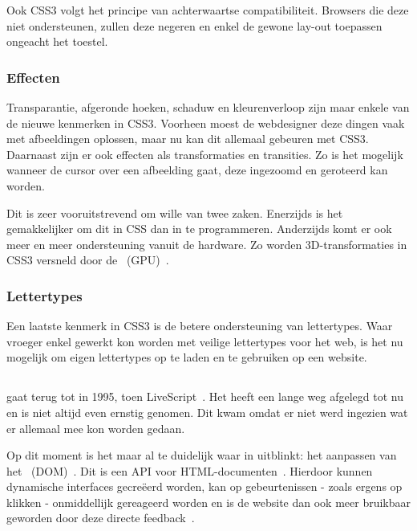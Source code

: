 Ook CSS3 volgt het principe van achterwaartse compatibiliteit. 
Browsers die deze  niet ondersteunen, zullen deze negeren en enkel de gewone lay-out toepassen ongeacht het toestel.

\subsubsection{Effecten}
Transparantie, afgeronde hoeken, schaduw en kleurenverloop zijn maar enkele van de nieuwe kenmerken in CSS3. 
Voorheen moest de webdesigner deze dingen vaak met afbeeldingen oplossen, maar nu kan dit allemaal gebeuren met CSS3. 
Daarnaast zijn er ook effecten als transformaties en transities. 
Zo is het mogelijk wanneer de cursor over een afbeelding gaat, deze ingezoomd en geroteerd kan worden. 

Dit is zeer vooruitstrevend om wille van twee zaken. 
Enerzijds is het gemakkelijker om dit in CSS dan in \js{} te programmeren. 
Anderzijds komt er ook meer en meer ondersteuning vanuit de hardware. 
Zo worden 3D-transformaties in CSS3 versneld door de ~(GPU)~\cite{Hales2012,Kool2012}.

\subsubsection{Lettertypes}
Een laatste kenmerk in CSS3 is de betere ondersteuning van lettertypes. 
Waar vroeger enkel gewerkt kon worden met veilige lettertypes voor het web, is het nu mogelijk om eigen lettertypes op te laden en te gebruiken op een website.

\subsection{\js}
\label{ref:javascript}
\js{} gaat terug tot in 1995, toen LiveScript~\cite{McFarland2011}. 
Het heeft een lange weg afgelegd tot nu en is niet altijd even ernstig genomen. 
Dit kwam omdat er niet werd ingezien wat er allemaal mee kon worden gedaan. 

Op dit moment is het maar al te duidelijk waar \js{} in uitblinkt: het aanpassen van het ~(DOM)~\cite{PhilDutson2012}. 
Dit is een API voor HTML-documenten~\cite{Hegaret2004}. 
Hierdoor kunnen dynamische interfaces gecreëerd worden, kan op gebeurtenissen - zoals ergens op klikken - onmiddellijk gereageerd worden en is de website dan ook meer bruikbaar geworden door deze directe feedback~\cite{McFarland2011}.

